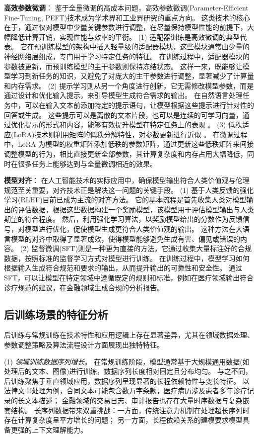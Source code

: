 \textbf{高效参数微调}：
鉴于全量微调的高成本问题，高效参数微调(Parameter-Efficient Fine-Tuning, PEFT)技术成为学术界和工业界研究的重点方向。
这类技术的核心在于，通过仅对模型中少量关键参数进行调整，在尽量保持模型性能的前提下，大幅降低计算开销，实现性能与效率的平衡。
(1) 适配器训练是高效微调的典型代表。
它在预训练模型的架构中插入轻量级的适配器模块，这些模块通常由少量的神经网络层组成，专门用于学习特定任务的特征。
在训练过程中，适配器模块的参数被更新，而预训练模型的主干参数则保持冻结状态。
这样一来，既能够让模型学习到新任务的知识，又避免了对庞大的主干参数进行调整，显著减少了计算量和内存需求。
(2) 提示学习则从另一个角度进行创新，它无需修改模型参数，而是通过设计和优化输入提示，来引导模型生成符合需求的输出。
在自然语言处理任务中，可以在输入文本前添加特定的提示语句，让模型根据这些提示进行针对性的回答或生成。
这些提示可以是离散的文本片段，也可以是连续的可学习向量，通过优化提示的形式和内容，能够有效提升模型在特定任务上的表现 。
(3) 低秩适应(LoRA)技术则利用矩阵的低秩分解特性，对参数更新进行近似 。
在微调过程中，LoRA 为模型的权重矩阵添加低秩的参数矩阵，通过更新这些低秩矩阵来间接调整模型的行为，相比直接更新全部参数，其计算复杂度和内存占用大幅降低，同时在很多任务上能够达到与全量微调相近的效果。

\textbf{模型对齐}：
在人工智能技术的实际应用中，确保模型输出符合人类价值观与伦理规范至关重要，对齐技术正是解决这一问题的关键手段。
(1) 基于人类反馈的强化学习(RLHF)目前已成为主流的对齐方法。
它的基本流程是首先收集人类对模型输出的评估数据，根据这些数据构建一个奖励模型，该模型用于评估模型输出与人类期望的符合程度。
然后，利用强化学习算法，以奖励模型给出的分数作为反馈信号，对模型进行优化，促使模型生成更符合人类价值观的输出。
这种方法在大语言模型的对齐中取得了显著成效，使得模型能够避免生成有害、偏见或错误的内容。
(2) 监督微调(SFT)则是一种更为直接的方法，它通过收集大量标注好的合规数据，按照标准的监督学习方式对模型进行训练。
在训练过程中，模型学习如何根据输入生成符合规范和要求的输出，从而提升输出的可靠性和安全性。
通过 SFT，可以让模型在特定领域中遵循既定的规则和标准，例如在医疗领域输出符合诊疗规范的建议，在金融领域生成合规的分析报告。

\subsection{后训练场景的特征分析}

后训练与常规训练在技术特性和应用逻辑上存在显著差异，尤其在领域数据处理、参数调整策略及算法流程设计方面展现出独特特征。

(1) \textit{领域训练数据序列增长}。
在常规训练阶段，模型通常基于大规模通用数据(如处理后的文本、图像)进行训练，数据序列长度相对固定且分布均匀。
与之不同，后训练聚焦于垂直领域应用，数据序列呈现显著的长程依赖特性与变长特征。
以法律文书处理为例，合同文本可能包含数万字条款，医疗病历涉及患者多年诊疗记录的长文本描述；
金融领域的交易日志、审计报告也存在大量时序数据与复杂嵌套结构。
长序列数据带来双重挑战：一方面，传统注意力机制在处理超长序列时存在计算复杂度呈平方增长的问题；
另一方面，长程依赖关系的建模要求模型具备更强的上下文理解能力。

